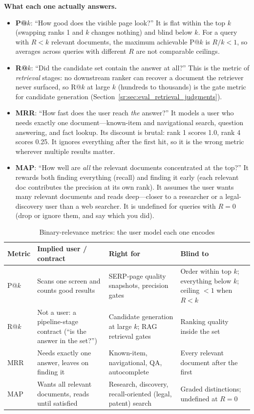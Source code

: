\textbf{What each one actually answers.}
\begin{itemize}
    \item \textbf{P@$k$}: ``How good does the visible page look?'' It is flat within the top $k$ (swapping ranks 1 and $k$ changes nothing) and blind below $k$. For a query with $R < k$ relevant documents, the maximum achievable P@$k$ is $R/k < 1$, so averages across queries with different $R$ are not comparable ceilings.
    \item \textbf{R@$k$}: ``Did the candidate set contain the answer at all?'' This is the metric of \textit{retrieval} stages: no downstream ranker can recover a document the retriever never surfaced, so R@$k$ at large $k$ (hundreds to thousands) is the gate metric for candidate generation (Section~\ref{sr:sec:eval_retrieval_judgments}).
    \item \textbf{MRR}: ``How fast does the user reach \textit{the} answer?'' It models a user who needs exactly one document---known-item and navigational search, question answering, and fact lookup. Its discount is brutal: rank 1 scores 1.0, rank 4 scores 0.25. It ignores everything after the first hit, so it is the wrong metric wherever multiple results matter.
    \item \textbf{MAP}: ``How well are \textit{all} the relevant documents concentrated at the top?'' It rewards both finding everything (recall) and finding it early (each relevant doc contributes the precision at its own rank). It assumes the user wants many relevant documents and reads deep---closer to a researcher or a legal-discovery user than a web searcher. It is undefined for queries with $R = 0$ (drop or ignore them, and say which you did).
\end{itemize}

\begin{table}[H]
\centering
\small
\caption{Binary-relevance metrics: the user model each one encodes}
\label{sr:tab:binary_metrics}
\begin{tabularx}{\textwidth}{lXXX}
\toprule
\textbf{Metric} & \textbf{Implied user / contract} & \textbf{Right for} & \textbf{Blind to} \\
\midrule
P@$k$ & Scans one screen and counts good results & SERP-page quality snapshots, precision gates & Order within top $k$; everything below $k$; ceiling $<1$ when $R<k$ \\
R@$k$ & Not a user: a pipeline-stage contract (``is the answer in the set?'') & Candidate generation at large $k$; RAG retrieval gates & Ranking quality inside the set \\
MRR & Needs exactly one answer, leaves on finding it & Known-item, navigational, QA, autocomplete & Every relevant document after the first \\
MAP & Wants all relevant documents, reads until satisfied & Research, discovery, recall-oriented (legal, patent) search & Graded distinctions; undefined at $R=0$ \\
\bottomrule
\end{tabularx}
\end{table}

